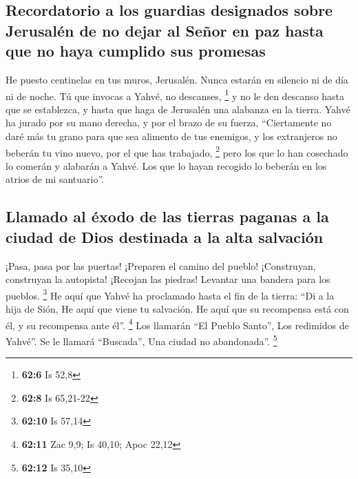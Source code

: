 \begin{paracol}{2}
\hypertarget{recordatorio-a-los-guardias-designados-sobre-jerusaluxe9n-de-no-dejar-al-seuxf1or-en-paz-hasta-que-no-haya-cumplido-sus-promesas}{%
\subsection{Recordatorio a los guardias designados sobre Jerusalén de no
dejar al Señor en paz hasta que no haya cumplido sus
promesas}\label{recordatorio-a-los-guardias-designados-sobre-jerusaluxe9n-de-no-dejar-al-seuxf1or-en-paz-hasta-que-no-haya-cumplido-sus-promesas}}

 He puesto centinelas en tus muros, Jerusalén. Nunca
estarán en silencio ni de día ni de noche. Tú que invocas a Yahvé, no
descanses, \footnote{\textbf{62:6} Is 52,8}  y no le den
descanso hasta que se establezca, y hasta que haga de Jerusalén una
alabanza en la tierra.  Yahvé ha jurado por su mano
derecha, y por el brazo de su fuerza, ``Ciertamente no daré más tu grano
para que sea alimento de tus enemigos, y los extranjeros no beberán tu
vino nuevo, por el que has trabajado, \footnote{\textbf{62:8} Is
  65,21-22}  pero los que lo han cosechado lo comerán y
alabarán a Yahvé. Los que lo hayan recogido lo beberán en los atrios de
mi santuario''.

\hypertarget{llamado-al-uxe9xodo-de-las-tierras-paganas-a-la-ciudad-de-dios-destinada-a-la-alta-salvaciuxf3n}{%
\subsection{Llamado al éxodo de las tierras paganas a la ciudad de Dios
destinada a la alta
salvación}\label{llamado-al-uxe9xodo-de-las-tierras-paganas-a-la-ciudad-de-dios-destinada-a-la-alta-salvaciuxf3n}}

 ¡Pasa, pasa por las puertas! ¡Preparen el camino del
pueblo! ¡Construyan, construyan la autopista! ¡Recojan las piedras!
Levantar una bandera para los pueblos. \footnote{\textbf{62:10} Is 57,14}
 He aquí que Yahvé ha proclamado hasta el fin de la
tierra: ``Di a la hija de Sión, He aquí que viene tu salvación. He aquí
que su recompensa está con él, y su recompensa ante él''. \footnote{\textbf{62:11}
  Zac 9,9; Is 40,10; Apoc 22,12}  Los llamarán ``El
Pueblo Santo'', Los redimidos de Yahvé''. Se le llamará ``Buscada'', Una
ciudad no abandonada''. \footnote{\textbf{62:12} Is 35,10}

\switchcolumn
\begin{otherlanguage}{english}


\end{otherlanguage}
\end{paracol}
